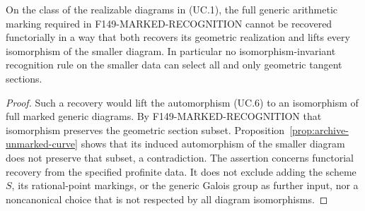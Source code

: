 \begin{corollary}
\label{cor:archive-no-unmarking}
On the class of the realizable diagrams in (UC.1), the full
generic arithmetic marking required in
F149-MARKED-RECOGNITION cannot be recovered functorially in a way
that both recovers its geometric realization and lifts every
isomorphism of the smaller diagram. In particular no
isomorphism-invariant recognition rule on the smaller data can
select all and only geometric tangent sections.
\end{corollary}

\begin{proof}
Such a recovery would lift the automorphism (UC.6) to an
isomorphism of full marked generic diagrams. By
F149-MARKED-RECOGNITION that isomorphism preserves the geometric
section subset. Proposition~\ref{prop:archive-unmarked-curve}
shows that its induced automorphism of the smaller diagram does
not preserve that subset, a contradiction.
The assertion concerns functorial recovery from the specified
profinite data. It does not exclude adding the scheme $S$, its
rational-point markings, or the generic Galois group as further
input, nor a noncanonical choice that is not respected by
all diagram isomorphisms.
\end{proof}
